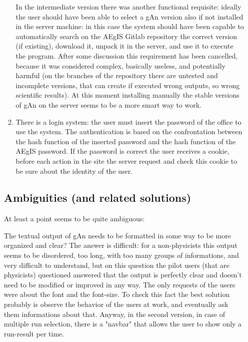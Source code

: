 \begin{enumerate}
\begin{enumerate}
In the intermediate version there was another functional requisite: ideally the user should have been able to select a gAn version also if not installed in the server machine: in this case the system should have been capable to automatically search on the AEgIS Gitlab repository the correct version (if existing), download it, unpack it in the server, and use it to execute the program. 
After some discussion this requirement has been cancelled, because it was considered complex, basically useless, and potentially harmful (on the branches of the repository there are untested and incomplete versions, that can create if executed wrong outputs, so wrong scientific results). At this moment installing manually the stable versions of gAn on the server seems to be a more smart way to work.

\item There is a login system: the user must insert the password of the office to use the system. The authentication is based on the confrontation between the hash function of the inserted password and the hash function of the AEgIS password. If the password is correct the user receives a cookie, before each action in the site the server request and check this cookie to be sure about the identity of the user.  


\end{enumerate}

\subsection{Ambiguities (and related solutions)}

At least a point seems to be quite ambiguous: 


The textual output of gAn needs to be formatted in some way to be more organized and clear? 
The answer is difficult: for a non-physicists this output seems to be disordered, too long, with too many groups of informations, and very difficult to understand, but on this question the pilot users (that are physicists) questioned answered that the output is perfectly clear and doesn't need to be modified or improved in any way. The only requests of the users were about the font and the font-size. To check this fact the best solution probably is observe the behavior of the users at work, and eventually ask them informations about that.
Anyway, in the second version, in case of multiple run selection, there is a "navbar" that allows the user to show only a run-result per time.


\end{enumerate}
